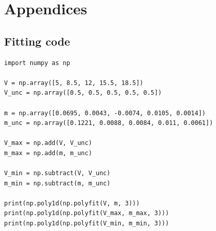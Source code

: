 \documentclass[a4paper]{article}
\begin{document}
\pagebreak
\section*{Appendices}

\subsection*{Fitting code}

\begin{verbatim}
import numpy as np

V = np.array([5, 8.5, 12, 15.5, 18.5])
V_unc = np.array([0.5, 0.5, 0.5, 0.5, 0.5])

m = np.array([0.0695, 0.0043, -0.0074, 0.0105, 0.0014])
m_unc = np.array([0.1221, 0.0088, 0.0084, 0.011, 0.0061])

V_max = np.add(V, V_unc)
m_max = np.add(m, m_unc)

V_min = np.subtract(V, V_unc)
m_min = np.subtract(m, m_unc)

print(np.poly1d(np.polyfit(V, m, 3)))
print(np.poly1d(np.polyfit(V_max, m_max, 3)))
print(np.poly1d(np.polyfit(V_min, m_min, 3)))
\end{verbatim}
\end{document}
